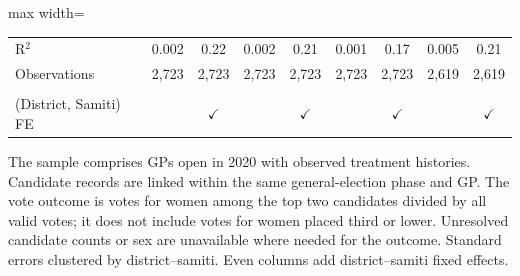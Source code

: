 \begin{table}[htbp]
\begin{adjustbox}{max width=\linewidth}
\begin{threeparttable}[b]
\begin{tabular}{lcccccccc}
             \\
            R$^2$                                                                                    & 0.002        & 0.22          & 0.002        & 0.21          & 0.001        & 0.17          & 0.005        & 0.21\\  
            Observations                                                                             & 2,723        & 2,723         & 2,723        & 2,723         & 2,723        & 2,723         & 2,619        & 2,619\\  
             \\
            (District, Samiti) FE                                                                    &              & $\checkmark$  &              & $\checkmark$  &              & $\checkmark$  &              & $\checkmark$\\   
            \bottomrule
         \end{tabular}
         
         \begin{tablenotes}
            \item The sample comprises GPs open in 2020 with observed treatment histories. Candidate records are linked within the same general-election phase and GP. The vote outcome is votes for women among the top two candidates divided by all valid votes; it does not include votes for women placed third or lower. Unresolved candidate counts or sex are unavailable where needed for the outcome. Standard errors clustered by district--samiti. Even columns add district--samiti fixed effects.
         \end{tablenotes}
      \end{threeparttable}
   \end{adjustbox}
\end{table}


